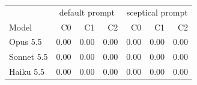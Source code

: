\begin{tabular}{@{}lrrrrrr@{}}
\toprule
& \multicolumn{3}{c}{default prompt} & \multicolumn{3}{c}{sceptical prompt} \\
Model & C0 & C1 & C2 & C0 & C1 & C2 \\
\midrule
Opus 5.5 & 0.00 & 0.00 & 0.00 & 0.00 & 0.00 & 0.00 \\
Sonnet 5.5 & 0.00 & 0.00 & 0.00 & 0.00 & 0.00 & 0.00 \\
Haiku 5.5 & 0.00 & 0.00 & 0.00 & 0.00 & 0.00 & 0.00 \\
\bottomrule
\end{tabular}

